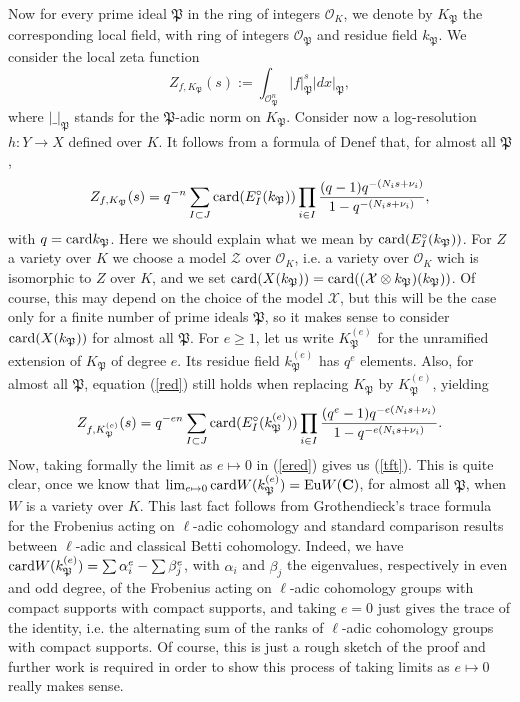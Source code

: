 \documentclass[english,12pt]{amsart}
\let\got\mathfrak
\def\gP{{\got P}}
\def\CC{{\mathbf C}}
\def\cO{{\mathcal O}}
\def\cX{{\mathcal X}}
\def\cZ{{\mathcal Z}}
\theoremstyle{definition}
\theoremstyle{remark}
\theoremstyle{plain}
\numberwithin{equation}{subsection}
\let\got\mathfrak
\def\CC{{\mathbf C}}
\def\cO{{\mathcal O}}
\def\cX{{\mathcal X}}
\def\cZ{{\mathcal Z}}
\begin{document}
Now for every prime ideal $\gP$
in the ring of integers $\cO_K$, we denote by $K_{\gP}$ the corresponding local
field, with ring of integers $\cO_{\gP}$ and residue field
$k_{\gP}$.
We consider the local zeta function
$$Z_{f, K_{\gP}} (s) := \int_{\cO_{\gP}^n} \vert f\vert_{\gP}^s \vert dx \vert_{\gP},$$
where $\vert \_ \vert_{\gP}$ stands for the $\gP$-adic norm on $K_{\gP}$.
Consider now a log-resolution
$h : Y \rightarrow X$ defined over $K$.
It follows from a formula of Denef \cite{D87}
that, for almost all $\gP$,
\begin{equation}\label{red}
Z_{f, K_{\gP}} (s)
=
q^{-n} 
\sum_{I \subset J} {\rm card} (E_I^{\circ} (k_{\gP}))
\prod_{i \in I}\frac{(q - 1)q^{- (N_i s + \nu_i)}}{1 - q^{- (N_i s + \nu_i)}},
\end{equation}
with $q = {\rm card} k_{\gP}$.
Here we should explain what we mean
by $ {\rm card} (E_I^{\circ} (k_{\gP}))$. For $Z$ a variety over
$K$ we choose a model $\cZ$ over $\cO_K$, i.e. a variety over 
$\cO_K$ wich is isomorphic to $Z$ over $K$, and we set
${\rm card} (X (k_{\gP})) = {\rm card} ((\cX \otimes k_{\gP}) (k_{\gP}))$.
Of course, this may depend on the choice of the model $\cX$, but 
this will be the case
only for a finite number of prime ideals $\gP$, 
so it makes sense to consider
${\rm card} (X (k_{\gP}))$ for almost all $\gP$.
For $e \geq 1$, let us write $ K_{\gP}^{(e)}$ for the unramified extension of
$K_{\gP}$ of degree $e$. Its residue field $k_{\gP}^{(e)}$ has $q^e$ elements.
Also, for almost all $\gP$,  equation (\ref{red}) still holds when
replacing $K_{\gP}$ by $ K_{\gP}^{(e)}$, 
yielding
\begin{equation}\label{ered}
Z_{f, K_{\gP}^{(e)}} (s)
=
q^{-en} 
\sum_{I \subset J} {\rm card} (E_I^{\circ} (k_{\gP}^{(e)}))
\prod_{i \in I}\frac{(q^e - 1)q^{- e(N_i s + \nu_i)}}{1 - q^{- e(N_i s + \nu_i)}}.
\end{equation}
Now, taking formally the limit as $e \mapsto 0$ in
(\ref{ered}) gives us (\ref{tft}). This is quite clear, once we
know
that $\lim_{e \mapsto 0} {\rm card}W (k_{\gP}^{(e)}) = {\rm Eu}  W (\CC)$,
for almost all $\gP$, when $W$
is a variety over $K$.
This last fact follows from Grothendieck's trace formula for the Frobenius acting
on $\ell$-adic cohomology and standard comparison results between
$\ell$-adic and classical Betti cohomology.
Indeed, we have ${\rm card}W (k_{\gP}^{(e)}) = \sum \alpha_i^e
- \sum \beta_j^e$, with $ \alpha_i$ and $ \beta_j$ the eigenvalues,
respectively in
even and odd degree,
of the Frobenius acting on  $\ell$-adic cohomology groups with compact supports
with compact supports, and taking $e = 0$ just gives the trace of the identity,
i.e. the alternating sum of the ranks of $\ell$-adic cohomology groups with compact supports.
Of course, this is just a rough sketch of the proof and further work is
required in order to show this process of
taking limits as $e \mapsto 0$ really makes sense.
\end{document}
